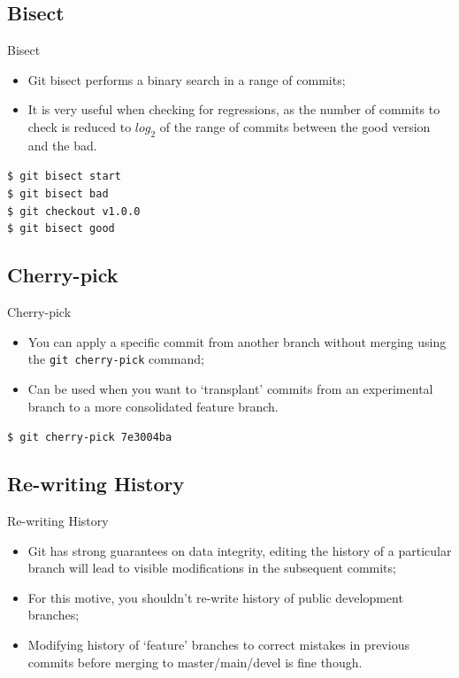\documentclass{beamer}
\begin{document}
\subsection{Bisect}
\begin{frame}{Bisect}
  \begin{itemize}
    \item Git bisect performs a binary search in a range of commits;
    \item It is very useful when checking for regressions, as the number of commits to check is reduced to $log_2$ of the range of commits between the good version and the bad.
  \end{itemize}
  \begin{block}{}
    \texttt{\$ git bisect start} \\
    \texttt{\$ git bisect bad} \\
    \texttt{\$ git checkout v1.0.0} \\
    \texttt{\$ git bisect good}
  \end{block}
\end{frame}

\subsection{Cherry-pick}
\begin{frame}{Cherry-pick}
  \begin{itemize}
    \item You can apply a specific commit from another branch without merging using the \texttt{git cherry-pick} command;
    \item Can be used when you want to `transplant' commits from an experimental branch to a more consolidated feature branch.
  \end{itemize}
  \begin{block}{}
    \texttt{\$ git cherry-pick 7e3004ba}
  \end{block}
\end{frame}

\subsection{Re-writing History}
\begin{frame}{Re-writing History}
  \begin{itemize}
    \item Git has strong guarantees on data integrity, editing the history of a particular branch will lead to visible modifications in the subsequent commits;
    \item For this motive, you shouldn't re-write history of public development branches;
    \item Modifying history of `feature' branches to correct mistakes in previous commits before merging to master/main/devel is fine though.
  \end{itemize}
\end{frame}
\end{document}
